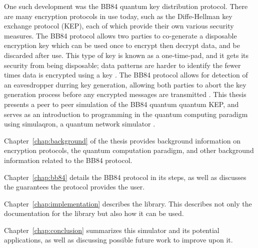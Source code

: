 One such development was the BB84 quantum key distribution protocol.
There are many encryption protocols in use today, such as the Diffe-Hellman key exchange protocol (KEP), each of which provide their own various security measures.
The BB84 protocol allows two parties to co-generate a disposable encryption key which can be used once to encrypt then decrypt data, and be discarded after use.
This type of key is known as a one-time-pad, and it gets its security from being disposable; data patterns are harder to identify the fewer times data is encrypted using a key \cite{TODO}.
The BB84 protocol allows for detection of an eavesdropper durring key generation, allowing both parties to abort the key generation process before any encrypted messages are transmitted \cite{qcftgu}.
This thesis presents a peer to peer simulation of the BB84 quantum quantum KEP, and serves as an introduction to programming in the quantum computing paradigm using simulaqron, a quantum network simulator \cite{simulaqron}.



Chapter~\ref{chap:background} of the thesis provides background information on encryption protocols, the quantum computation paradigm, and other background information related to the BB84 protocol. 

Chapter~\ref{chap:bb84} details the BB84 protocol in its steps, as well as discusses the guarantees the protocol provides the user.

Chapter~\ref{chap:implementation} describes the library.
This describes not only the documentation for the library but also how it can be used.

Chapter~\ref{chap:conclusion} summarizes this simulator and its potential applications, as well as discussing possible future work to improve upon it.


